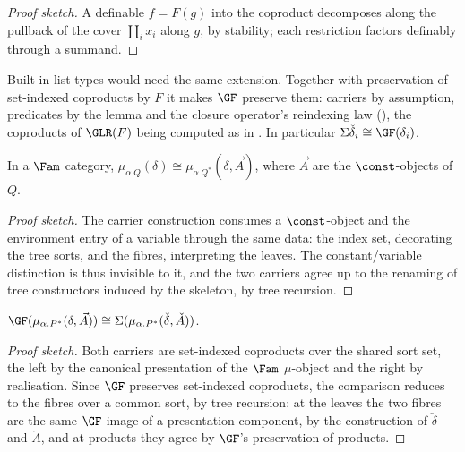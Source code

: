\begin{proof}[Proof sketch]
A definable $f = F(g)$ into the coproduct decomposes along the pullback of the cover
$\coprod_i x_i$ along $g$, by stability; each restriction factors definably through a summand.
\end{proof}

Built-in list types would need the same extension. Together with preservation of set-indexed
coproducts by $F$ it makes $\GF$ preserve them: carriers by assumption, predicates by the lemma and
the closure operator's reindexing law (), the coproducts of
$\GLR(F)$ being computed as in . In particular
$\Sigma\check{\delta}_i \cong \GF(\delta_i)$.

\begin{lemma}[Skeleton]
\label{lem:conservativity:skeleton}
In a $\Fam$ category, $\mu_{\alpha.Q}(\delta) \cong \mu_{\alpha.Q^{*}}(\delta, \vec{A})$,
where $\vec{A}$ are the $\const$-objects of $Q$.
\end{lemma}

\begin{proof}[Proof sketch]
The carrier construction consumes a $\const$-object and the environment entry of a variable
through the same data: the index set, decorating the tree sorts, and the fibres, interpreting the
leaves. The constant/variable distinction is thus invisible to it, and the two carriers agree up to
the renaming of tree constructors induced by the skeleton, by tree recursion.
\end{proof}

\begin{lemma}
\label{lem:conservativity:carrier-comparison}
$\GF(\mu_{\alpha.P^{*}}(\delta, \vec{A})) \cong \Sigma(\mu_{\alpha.P^{*}}(\check{\delta},
\check{A}))$.
\end{lemma}

\begin{proof}[Proof sketch]
Both carriers are set-indexed coproducts over the shared sort set, the left by the canonical
presentation of the $\Fam$ $\mu$-object and the right by realisation. Since $\GF$ preserves
set-indexed coproducts, the comparison reduces to the fibres over a common sort, by tree
recursion: at the leaves the two fibres are the same $\GF$-image of a presentation component, by
the construction of $\check{\delta}$ and $\check{A}$, and at products they agree by $\GF$'s
preservation of products.
\end{proof}

